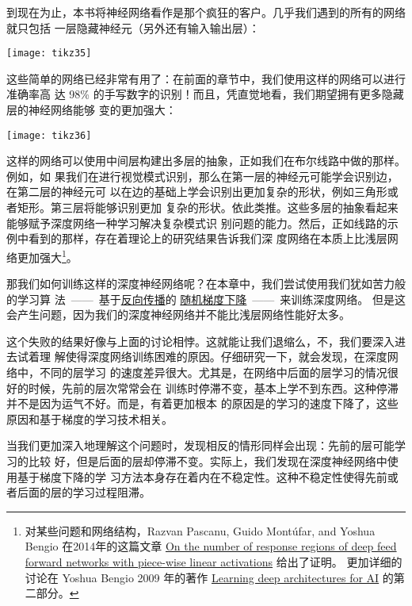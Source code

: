 到现在为止，本书将神经网络看作是那个疯狂的客户。几乎我们遇到的所有的网络就只包括
一层隐藏神经元（另外还有输入输出层）：
\begin{center}
  \texttt{[image: tikz35]}
\end{center}

这些简单的网络已经非常有用了：在前面的章节中，我们使用这样的网络可以进行准确率高
达 98\% 的手写数字的识别！而且，凭直觉地看，我们期望拥有更多隐藏层的神经网络能够
变的更加强大：
\begin{center}
  \texttt{[image: tikz36]}
\end{center}

这样的网络可以使用中间层构建出多层的抽象，正如我们在布尔线路中做的那样。例如，如
果我们在进行视觉模式识别，那么在第一层的神经元可能学会识别边，在第二层的神经元可
以在边的基础上学会识别出更加复杂的形状，例如三角形或者矩形。第三层将能够识别更加
复杂的形状。依此类推。这些多层的抽象看起来能够赋予深度网络一种学习解决复杂模式识
别问题的能力。然后，正如线路的示例中看到的那样，存在着理论上的研究结果告诉我们深
度网络在本质上比浅层网络更加强大\footnote{对某些问题和网络结构，Razvan Pascanu,
  Guido Montúfar, and Yoshua Bengio 在2014年的这篇文章
  \href{http://arxiv.org/pdf/1312.6098.pdf}{On the number of response regions of
    deep feed forward networks with piece-wise linear activations} 给出了证明。
  更加详细的讨论在 Yoshua Bengio 2009 年的著作
  \href{http://www.iro.umontreal.ca/~bengioy/papers/ftml_book.pdf}{Learning deep
    architectures for AI} 的第二部分。}。
 
那我们如何训练这样的深度神经网络呢？在本章中，我们尝试使用我们犹如苦力般的学习算
法~——~基于\hyperref[ch:HowTheBackpropagationAlgorithmWorks]{反向传播}的%
\hyperref[sec:learning_with_gradient_descent]{随机梯度下降}~——~来训练深度网络。
但是这会产生问题，因为我们的深度神经网络并不能比浅层网络性能好太多。
 
这个失败的结果好像与上面的讨论相悖。这就能让我们退缩么，不，我们要深入进去试着理
解使得深度网络训练困难的原因。仔细研究一下，就会发现，在深度网络中，不同的层学习
的速度差异很大。尤其是，在网络中后面的层学习的情况很好的时候，先前的层次常常会在
训练时停滞不变，基本上学不到东西。这种停滞并不是因为运气不好。而是，有着更加根本
的原因是的学习的速度下降了，这些原因和基于梯度的学习技术相关。
 
当我们更加深入地理解这个问题时，发现相反的情形同样会出现：先前的层可能学习的比较
好，但是后面的层却停滞不变。实际上，我们发现在深度神经网络中使用基于梯度下降的学
习方法本身存在着内在不稳定性。这种不稳定性使得先前或者后面的层的学习过程阻滞。
 
